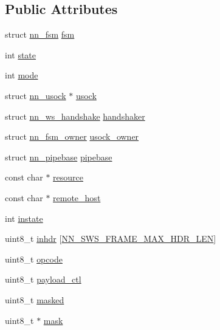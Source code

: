 \subsection*{Public Attributes}
\begin{DoxyCompactItemize}
\item 
struct \hyperlink{structnn__fsm}{nn\+\_\+fsm} \hyperlink{structnn__sws_ae9c5bfd9cd2fda9942c5e25c6826ed3c}{fsm}
\item 
int \hyperlink{structnn__sws_a5c81cb6775c4dd2361723fc2db885144}{state}
\item 
int \hyperlink{structnn__sws_a88b0e0d57fcf681ef53be2ca49f2a341}{mode}
\item 
struct \hyperlink{structnn__usock}{nn\+\_\+usock} $\ast$ \hyperlink{structnn__sws_a2ec23037adda6557d8a2dd1f9524d4d5}{usock}
\item 
struct \hyperlink{structnn__ws__handshake}{nn\+\_\+ws\+\_\+handshake} \hyperlink{structnn__sws_a4060b8ee8880773dbfd7b3157695f258}{handshaker}
\item 
struct \hyperlink{structnn__fsm__owner}{nn\+\_\+fsm\+\_\+owner} \hyperlink{structnn__sws_a4bab9824cd6a75292195050f84075619}{usock\+\_\+owner}
\item 
struct \hyperlink{structnn__pipebase}{nn\+\_\+pipebase} \hyperlink{structnn__sws_a993f8e3fb7b7dc260b1764d3d4407373}{pipebase}
\item 
const char $\ast$ \hyperlink{structnn__sws_a7731d83e17f5bc25ed896d04bcec55ab}{resource}
\item 
const char $\ast$ \hyperlink{structnn__sws_a578ee74c7d337faa8b47246da9a35ebe}{remote\+\_\+host}
\item 
int \hyperlink{structnn__sws_a7b03ede6d1254c1bc96a340c6ad9a836}{instate}
\item 
uint8\+\_\+t \hyperlink{structnn__sws_a0a288b7934dcd70b5ec2e7f28a34ab9d}{inhdr} \mbox{[}\hyperlink{sws_8h_a3f2d4522741ce9d1814c024af679c186}{N\+N\+\_\+\+S\+W\+S\+\_\+\+F\+R\+A\+M\+E\+\_\+\+M\+A\+X\+\_\+\+H\+D\+R\+\_\+\+L\+EN}\mbox{]}
\item 
uint8\+\_\+t \hyperlink{structnn__sws_ada6f7afdf041c89256866209929c7016}{opcode}
\item 
uint8\+\_\+t \hyperlink{structnn__sws_af8f49b597cf5b93f5eb9758d0a178c5d}{payload\+\_\+ctl}
\item 
uint8\+\_\+t \hyperlink{structnn__sws_a878c0c3510f1d0540e8ed0fd456defa4}{masked}
\item 
uint8\+\_\+t $\ast$ \hyperlink{structnn__sws_ae9606f6f98dbabbe0ab905b78cf4b3dc}{mask}
\item 

\end{DoxyCompactItemize}
